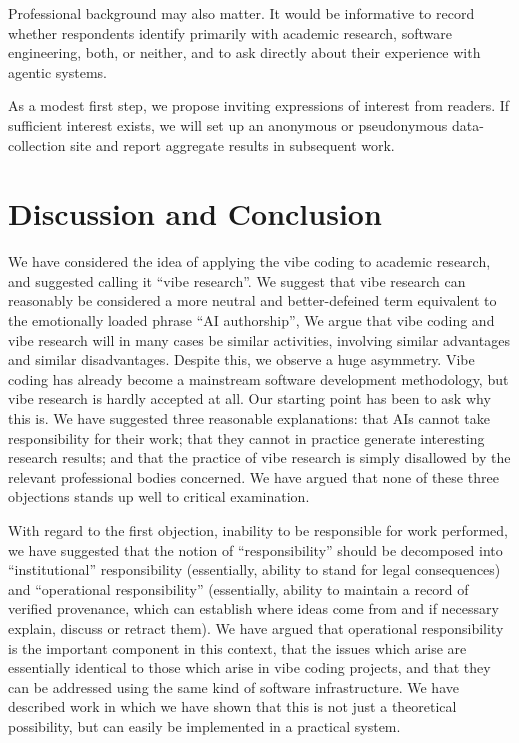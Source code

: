 \documentclass[12pt]{article}
\begin{document}
Professional background may also matter. It would be informative to record whether respondents identify primarily with academic research, software engineering, both, or neither, and to ask directly about their experience with agentic systems.

As a modest first step, we propose inviting expressions of interest from readers. If sufficient interest exists, we will set up an anonymous or pseudonymous data-collection site and report aggregate results in subsequent work.

\section{Discussion and Conclusion}

We have considered the idea of applying the vibe coding to academic research, and suggested calling it ``vibe research''. We suggest that vibe research can reasonably be considered a more neutral and better-defeined term equivalent to the emotionally loaded phrase ``AI authorship'', We argue that vibe coding and vibe research will in many cases be similar activities, involving similar advantages and similar disadvantages. Despite this, we observe a huge asymmetry. Vibe coding has already become a mainstream software development methodology, but vibe research is hardly accepted at all. Our starting point has been to ask why this is. We have suggested three reasonable explanations: that AIs cannot take responsibility for their work; that they cannot in practice generate interesting research results; and that the practice of vibe research is simply disallowed by the relevant professional bodies concerned. We have argued that none of these three objections stands up well to critical examination.

With regard to the first objection, inability to be responsible for work performed, we have suggested that the notion of ``responsibility'' should be decomposed into ``institutional'' responsibility (essentially, ability to stand for legal consequences) and ``operational responsibility'' (essentially, ability to maintain a record of verified provenance, which can establish where ideas come from and if necessary explain, discuss or retract them). We have argued that operational responsibility is the important component in this context, that the issues which arise are essentially identical to those which arise in vibe coding projects, and that they can be addressed using the same kind of software infrastructure. We have described work in which we have shown that this is not just a theoretical possibility, but can easily be implemented in a practical system.
\end{document}
